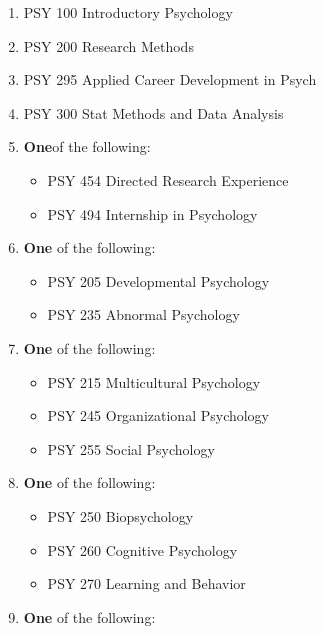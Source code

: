 \documentclass[
  letterpaper,
]{scrbook}
\providecommand{\tightlist}{%
  \setlength{\itemsep}{0pt}\setlength{\parskip}{0pt}}
\begin{document}
\begin{enumerate}
\def\labelenumi{\arabic{enumi}.}
\tightlist
\item
  PSY 100 Introductory Psychology\\
\item
  PSY 200 Research Methods\\
\item
  PSY 295 Applied Career Development in Psych\\
\item
  PSY 300 Stat Methods and Data Analysis\\
\item
  \textbf{One}of the following:

  \begin{itemize}
  \tightlist
  \item
    PSY 454 Directed Research Experience\\
  \item
    PSY 494 Internship in Psychology\\
  \end{itemize}
\item
  \textbf{One} of the following:

  \begin{itemize}
  \tightlist
  \item
    PSY 205 Developmental Psychology\\
  \item
    PSY 235 Abnormal Psychology\\
  \end{itemize}
\item
  \textbf{One} of the following:

  \begin{itemize}
  \tightlist
  \item
    PSY 215 Multicultural Psychology\\
  \item
    PSY 245 Organizational Psychology\\
  \item
    PSY 255 Social Psychology\\
  \end{itemize}
\item
  \textbf{One} of the following:

  \begin{itemize}
  \tightlist
  \item
    PSY 250 Biopsychology\\
  \item
    PSY 260 Cognitive Psychology\\
  \item
    PSY 270 Learning and Behavior\\
  \end{itemize}
\item
  \textbf{One} of the following:


\end{enumerate}
\end{document}
